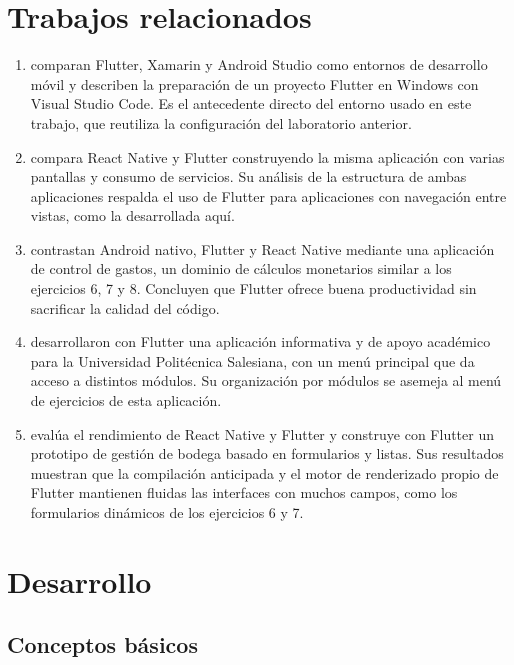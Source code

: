 \documentclass[12pt,a4paper]{article}
\begin{document}
\section{Trabajos relacionados}

\begin{enumerate}[leftmargin=1.5cm]
  \item \citet{quisaguano2022} comparan Flutter, Xamarin y Android Studio como entornos de desarrollo móvil y describen la preparación de un proyecto Flutter en Windows con Visual Studio Code. Es el antecedente directo del entorno usado en este trabajo, que reutiliza la configuración del laboratorio anterior.
  \item \citet{fentaw2020} compara React Native y Flutter construyendo la misma aplicación con varias pantallas y consumo de servicios. Su análisis de la estructura de ambas aplicaciones respalda el uso de Flutter para aplicaciones con navegación entre vistas, como la desarrollada aquí.
  \item \citet{george2025} contrastan Android nativo, Flutter y React Native mediante una aplicación de control de gastos, un dominio de cálculos monetarios similar a los ejercicios 6, 7 y 8. Concluyen que Flutter ofrece buena productividad sin sacrificar la calidad del código.
  \item \citet{torres2021} desarrollaron con Flutter una aplicación informativa y de apoyo académico para la Universidad Politécnica Salesiana, con un menú principal que da acceso a distintos módulos. Su organización por módulos se asemeja al menú de ejercicios de esta aplicación.
  \item \citet{safavi2025} evalúa el rendimiento de React Native y Flutter y construye con Flutter un prototipo de gestión de bodega basado en formularios y listas. Sus resultados muestran que la compilación anticipada y el motor de renderizado propio de Flutter mantienen fluidas las interfaces con muchos campos, como los formularios dinámicos de los ejercicios 6 y 7.
\end{enumerate}

\section{Desarrollo}

\subsection{Conceptos básicos}
\end{document}
